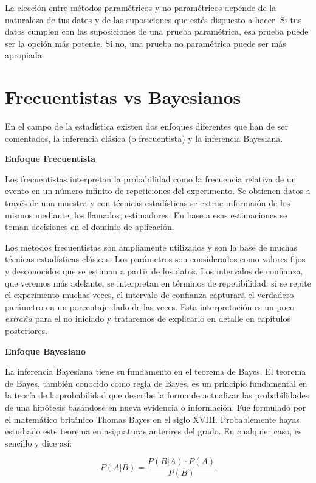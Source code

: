 \documentclass[
  letterpaper,
  DIV=11,
  numbers=noendperiod]{scrreprt}
\begin{document}
La elección entre métodos paramétricos y no paramétricos depende de la
naturaleza de tus datos y de las suposiciones que estés dispuesto a
hacer. Si tus datos cumplen con las suposiciones de una prueba
paramétrica, esa prueba puede ser la opción más potente. Si no, una
prueba no paramétrica puede ser más apropiada.

\hypertarget{frecuentistas-vs-bayesianos}{%
\section{Frecuentistas vs
Bayesianos}\label{frecuentistas-vs-bayesianos}}

En el campo de la estadística existen dos enfoques diferentes que han de
ser comentados, la inferencia clásica (o frecuentista) y la inferencia
Bayesiana.

\textbf{Enfoque Frecuentista}

Los frecuentistas interpretan la probabilidad como la frecuencia
relativa de un evento en un número infinito de repeticiones del
experimento. Se obtienen datos a través de una muestra y con técnicas
estadísticas se extrae informaión de los mismos mediante, los llamados,
estimadores. En base a esas estimaciones se toman decisiones en el
dominio de aplicación.

Los métodos frecuentistas son ampliamente utilizados y son la base de
muchas técnicas estadísticas clásicas. Los parámetros son considerados
como valores fijos y desconocidos que se estiman a partir de los datos.
Los intervalos de confianza, que veremos más adelante, se interpretan en
términos de repetibilidad: si se repite el experimento muchas veces, el
intervalo de confianza capturará el verdadero parámetro en un porcentaje
dado de las veces. Esta interpretación es un poco \emph{extraña} para el
no iniciado y trataremos de explicarlo en detalle en capítulos
posteriores.

\textbf{Enfoque Bayesiano}

La inferencia Bayesiana tiene su fundamento en el teorema de Bayes. El
teorema de Bayes, también conocido como regla de Bayes, es un principio
fundamental en la teoría de la probabilidad que describe la forma de
actualizar las probabilidades de una hipótesis basándose en nueva
evidencia o información. Fue formulado por el matemático británico
Thomas Bayes en el siglo XVIII. Probablemente hayas estudiado este
teorema en asignaturas anterires del grado. En cualquier caso, es
sencillo y dice así:

\[
P(A|B) = \frac{P(B|A) \cdot P(A)}{P(B)}
\]
\end{document}
